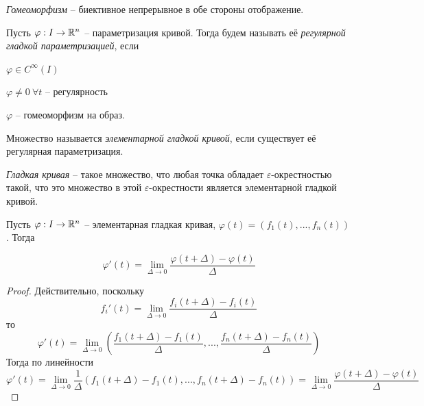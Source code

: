 
\begin{Def}[Гомеоморфизм]
	\textit{Гомеоморфизм} -- биективное непрерывное в обе стороны отображение.
\end{Def}

\begin{Def}
	Пусть $\varphi : I \to \mathbb{R}^n$ -- параметризация кривой. Тогда будем называть её \textit{регулярной гладкой параметризацией}, если
	\begin{MyList}
		\item $\varphi \in C^\infty (I)$ 
		\item $\varphi \neq 0 \ \forall t$ -- регулярность
		\item $\varphi$ -- гомеоморфизм на образ.  
	\end{MyList}
\end{Def}

\begin{Def}
	Множество называется \textit{элементарной гладкой кривой}, если существует её регулярная параметризация.
\end{Def}

\begin{Def}
	\textit{Гладкая кривая} -- такое множество, что любая точка обладает $\varepsilon$-окрестностью такой, что это множество в этой $\varepsilon$-окрестности является элементарной гладкой кривой.
\end{Def}


\begin{Thm}
	Пусть $\varphi : I \to \mathbb{R}^n$ -- элементарная гладкая кривая, $\varphi(t) = (f_1(t), ..., f_n(t))$.
	Тогда

	\[\varphi'(t) = \lim_{\Delta \to 0} \frac{\varphi(t + \Delta) - \varphi(t)}{\Delta}\]
\end{Thm}

\begin{proof}
	Действительно, поскольку
	\[f_i'(t) = \lim_{\Delta \to 0} \frac{f_i(t + \Delta) - f_i(t)}{\Delta}\]
	то 
	\[\varphi'(t) = \lim_{\Delta \to 0} \left( \frac{f_1(t + \Delta) - f_1(t)}{\Delta}, ..., \frac{f_n(t + \Delta) - f_n(t)}{\Delta}\right)\]
	Тогда по линейности
	\[\varphi'(t) = \lim_{\Delta \to 0} \frac{1}{\Delta} \left(f_1(t + \Delta) - f_1(t), ..., f_n(t + \Delta) - f_n(t)\right) = \lim_{\Delta \to 0} \frac{\varphi(t + \Delta) - \varphi(t)}{\Delta}\]
\end{proof}

